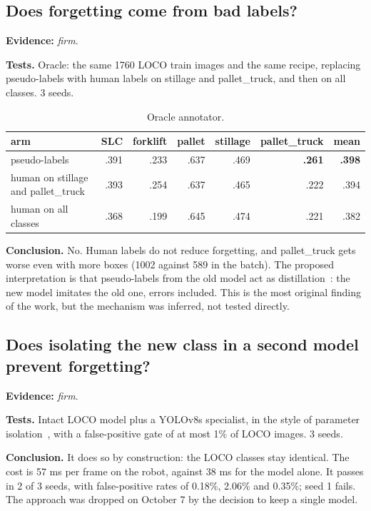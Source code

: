 \documentclass[11pt,a4paper]{article}
\newcommand{\evidence}[1]{\noindent\textbf{Evidence:} \emph{#1}.\par}
\newcommand{\tests}{\noindent\textbf{Tests.} }
\newcommand{\conclusion}{\noindent\textbf{Conclusion.} }
\begin{document}
\subsection{Does forgetting come from bad labels?}
\label{q:oracle}
\evidence{firm}

\tests Oracle: the same 1760 LOCO train images and the same recipe, replacing
pseudo-labels with human labels on stillage and pallet\_truck, and then on all
classes. 3 seeds.

\begin{table}[H]
\centering\small
\caption{Oracle annotator.}
\begin{tabular}{lrrrrrr}
\toprule
arm & SLC & forklift & pallet & stillage & pallet\_truck & mean \\
\midrule
pseudo-labels & .391 & .233 & .637 & .469 & \textbf{.261} & \textbf{.398} \\
human on stillage and pallet\_truck & .393 & .254 & .637 & .465 & .222 & .394 \\
human on all classes & .368 & .199 & .645 & .474 & .221 & .382 \\
\bottomrule
\end{tabular}
\end{table}

\conclusion No. Human labels do not reduce forgetting, and pallet\_truck gets worse
even with more boxes (1002 against 589 in the batch). The proposed interpretation
is that pseudo-labels from the old model act as distillation~\cite{hinton}: the new
model imitates the old one, errors included. This is the most original finding of
the work, but the mechanism was inferred, not tested directly.

\subsection{Does isolating the new class in a second model prevent forgetting?}
\evidence{firm}

\tests Intact LOCO model plus a YOLOv8s specialist, in the style of parameter
isolation~\cite{progressive}, with a false-positive gate of at most 1\% of LOCO
images. 3 seeds.

\conclusion It does so by construction: the LOCO classes stay identical. The cost
is 57 ms per frame on the robot, against 38 ms for the model alone. It passes in 2
of 3 seeds, with false-positive rates of 0.18\%, 2.06\% and 0.35\%; seed 1 fails.
The approach was dropped on October 7 by the decision to keep a single model.
\end{document}
